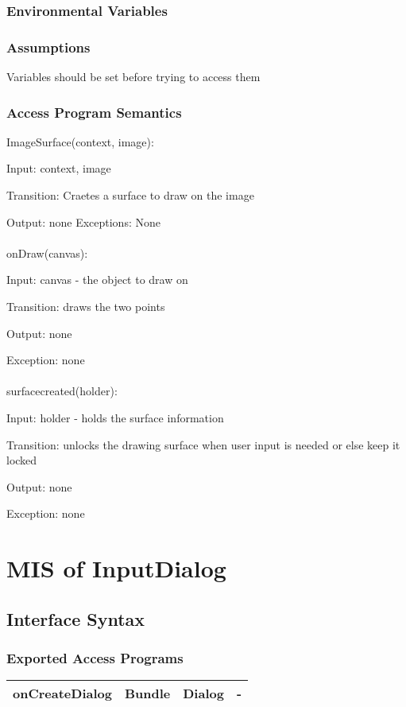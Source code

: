 \documentclass[12,english]{article}
\begin{document}
		\subsubsection{Environmental Variables}
		
		\subsubsection{Assumptions}
		Variables should be set before trying to access them
		
		\subsubsection{Access Program Semantics}
		
		ImageSurface(context, image):
		
		Input: context, image
		
		Transition: Craetes a surface to draw on the image
		
		Output: none
		Exceptions: None\\
		\\
		onDraw(canvas):
		
		Input: canvas - the object to draw on
		
		Transition: draws the two points 
		
		Output: none
		
		Exception: none\\ 
		\\
		surfacecreated(holder):
		
		Input: holder - holds the surface information 
		
		Transition: unlocks the drawing surface when user input is needed or else keep it locked
		
		Output: none
		
		Exception: none\\ 
		
	
	
	
\section{MIS of InputDialog}
	\subsection{Interface Syntax}
		\subsubsection{Exported Access Programs}
		\begin{table}[!htbp]
		\begin{tabular}{|c|c|c|c|}
			\hline
			onCreateDialog & Bundle & Dialog & - \\ \hline
		\end{tabular}
	\end{table}
		
\end{document}
